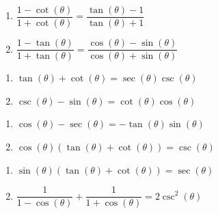 \begin{multicols}{2}

\begin{enumerate}

\setcounter{enumi}{\value{HW}}

\item $\dfrac{1 - \cot(\theta)}{1+ \cot(\theta)} = \dfrac{\tan(\theta) - 1}{\tan(\theta) + 1}$
\item $\dfrac{1 - \tan(\theta)}{1+ \tan(\theta)} = \dfrac{\cos(\theta) - \sin(\theta)}{\cos(\theta) + \sin(\theta)}$

\setcounter{HW}{\value{enumi}}

\end{enumerate}

\end{multicols}

\begin{multicols}{2}

\begin{enumerate}

\setcounter{enumi}{\value{HW}}

\item $\tan(\theta) + \cot(\theta) = \sec(\theta)\csc(\theta)$
\item $\csc(\theta) - \sin(\theta) = \cot(\theta)\cos(\theta)$

\setcounter{HW}{\value{enumi}}

\end{enumerate}

\end{multicols}

\begin{multicols}{2}

\begin{enumerate}

\setcounter{enumi}{\value{HW}}

\item $\cos(\theta) - \sec(\theta) = -\tan(\theta)\sin(\theta)$
\item $\cos(\theta)(\tan(\theta) + \cot(\theta)) = \csc(\theta)$

\setcounter{HW}{\value{enumi}}

\end{enumerate}

\end{multicols}

\begin{multicols}{2}

\begin{enumerate}

\setcounter{enumi}{\value{HW}}

\item $\sin(\theta)(\tan(\theta) + \cot(\theta)) = \sec(\theta)$ 
\item   $\dfrac{1}{1-\cos(\theta)} + \dfrac{1}{1+\cos(\theta)} = 2\csc^{2}(\theta)$

\setcounter{HW}{\value{enumi}}

\end{enumerate}

\end{multicols}

